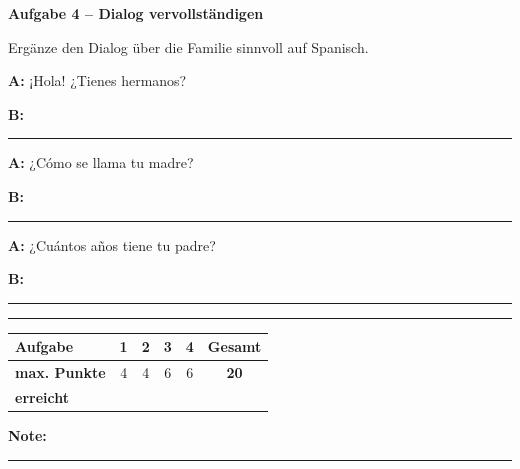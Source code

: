 \documentclass[11pt, a4paper]{article}
\newcommand{\fachfarbe}{spanisch}
\newcommand{\punktebox}[1]{\hfill\fbox{\small \_/#1}}
\newcommand{\luecke}[1]{\rule{#1}{0.4pt}}
\newenvironment{aufgabe}[1]{%
    \needspace{5\baselineskip}%
    \nopagebreak[4]%
    \vspace{10pt}
    \noindent\textbf{\textcolor{\fachfarbe}{Aufgabe #1}}
    \nopagebreak[4]%
    \vspace{5pt}
    \nopagebreak[4]%
    \begin{list}{}{\leftmargin=0pt}
    \item[]
}{%
    \end{list}
}
\begin{document}

\begin{aufgabe}{4 -- Dialog vervollständigen}
Ergänze den Dialog über die Familie sinnvoll auf Spanisch. \punktebox{6}
\end{aufgabe}

\noindent
\textbf{A:} ¡Hola! ¿Tienes hermanos?

\vspace{0.8em}

\noindent
\textbf{B:} \luecke{8cm}

\vspace{0.8em}

\noindent
\textbf{A:} ¿Cómo se llama tu madre?

\vspace{0.8em}

\noindent
\textbf{B:} \luecke{8cm}

\vspace{0.8em}

\noindent
\textbf{A:} ¿Cuántos años tiene tu padre?

\vspace{0.8em}

\noindent
\textbf{B:} \luecke{8cm}


\vspace{25pt}
\hrule
\vspace{10pt}

\noindent
\begin{tabularx}{\textwidth}{|X|c|c|c|c||c|}
\hline
\textbf{Aufgabe} & 1 & 2 & 3 & 4 & \textbf{Gesamt} \\
\hline
\textbf{max. Punkte} & 4 & 4 & 6 & 6 & \textbf{20} \\
\hline
\textbf{erreicht} & & & & & \\[0.8em]
\hline
\end{tabularx}

\vspace{10pt}

\begin{flushright}
\textbf{Note:} \luecke{2cm}
\end{flushright}
\end{document}
